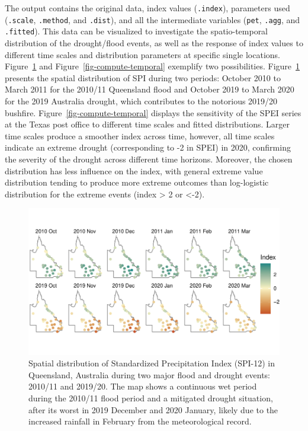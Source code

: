\documentclass[
]{interact}
\begin{document}
The output contains the original data, index values (\texttt{.index}),
parameters used (\texttt{.scale}, \texttt{.method}, and \texttt{.dist}),
and all the intermediate variables (\texttt{pet}, \texttt{.agg}, and
\texttt{.fitted}). This data can be visualized to investigate the
spatio-temporal distribution of the drought/flood events, as well as the
response of index values to different time scales and distribution
parameters at specific single locations.
Figure~\ref{fig-compute-spatial} and Figure~\ref{fig-compute-temporal}
exemplify two possibilities. Figure~\ref{fig-compute-spatial} presents
the spatial distribution of SPI during two periods: October 2010 to
March 2011 for the 2010/11 Queensland flood and October 2019 to March
2020 for the 2019 Australia drought, which contributes to the notorious
2019/20 bushfire. Figure~\ref{fig-compute-temporal} displays the
sensitivity of the SPEI series at the Texas post office to different
time scales and fitted distributions. Larger time scales produce a
smoother index across time, however, all time scales indicate an extreme
drought (corresponding to -2 in SPEI) in 2020, confirming the severity
of the drought across different time horizons. Moreover, the chosen
distribution has less influence on the index, with general extreme value
distribution tending to produce more extreme outcomes than log-logistic
distribution for the extreme events (index \textgreater{} 2 or
\textless-2).

\begin{figure}

{\centering \includegraphics{tidyindex_files/figure-pdf/fig-compute-spatial-1.pdf}

}

\caption{\label{fig-compute-spatial}Spatial distribution of Standardized
Precipitation Index (SPI-12) in Queensland, Australia during two major
flood and drought events: 2010/11 and 2019/20. The map shows a
continuous wet period during the 2010/11 flood period and a mitigated
drought situation, after its worst in 2019 December and 2020 January,
likely due to the increased rainfall in February from the meteorological
record.}

\end{figure}
\end{document}

